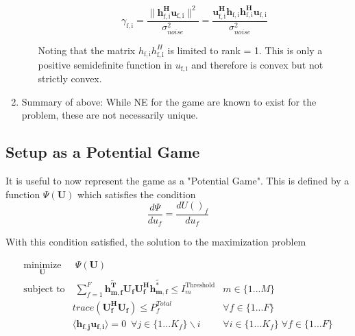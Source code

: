 \documentclass[12pt]{article}
\begin{document}
\begin{enumerate}
\begin{itemize}
	\begin{equation}\label{zf_snr}
	\gamma_{\mathrm{f,i}} = \frac{\|\mathbf{h^H_{\mathrm{f,i}}u_{\mathrm{f,i}}}\|^2}
	{\sigma^2_{noise}  
	}
	= 
	\frac{\mathbf{u^H_{\mathrm{f,i}}h_{\mathrm{f,i}}h^H_{\mathrm{f,i}}u_{\mathrm{f,i}}}}
	{\sigma^2_{noise}  
	}
	\end{equation}
	
	Noting that the matrix 
	$h_{\mathrm{f,i}}h^H_{\mathrm{f,i}}$
	is limited to rank = 1. This is only a positive semidefinite function in 
	$u_{\mathrm{f,i}}$ and therefore is convex but not strictly convex.

\end{itemize}


\item
Summary of above: 
While NE for the game are known to exist for the problem, these are not necessarily unique. 

\end{enumerate}





\subsection{Setup as a Potential Game}
It is useful to now represent the game as a "Potential Game". This is defined by a function
$ \Psi(\mathbf{U})$ which satisfies the condition
\begin{equation}\label{potential_game_condition}
\frac{d\Psi}{du_f} = \frac{d U()_f}{du_f}
\end{equation}


With this condition satisfied, the solution to the maximization problem 

\begin{subequations}
	\label{optim}
	\begin{align}
	    \underset{\mathbf{U}}{\text{minimize}}
	    & \; \Psi(\mathbf{U}) \label{potential_game} 
	    \\
	    \text{subject to}  & \;
	    \sum^F_{f=1}\mathbf{\tilde{h_{m,f}^T}}  \mathbf{U_f}  \mathbf{U_f^H}
		\mathbf{\tilde{h_{m,f}^*}} \leq I^{\mathrm{Threshold}}_{m} & m \in \{1 ...M\} 
		\label{interference_const_central}\\
        & trace(\mathbf{U_f^H}\mathbf{U_f}) \leq P^{Total}_{f} & \forall f \in \{1 ... F\}
        \label{power_const_central}\\
        & \langle \mathbf{h_{f,j}}\mathbf{u_{f,i}} \rangle =0\ \; \forall j \in \{1... K_f\}				\backslash i &\forall i \in \{1 ... K_f\}\; \forall f \in \{1 ... F\} \label{zf_const_central}
	\end{align}
	\end{subequations}
\end{document}
